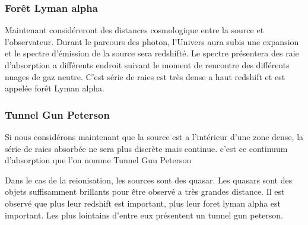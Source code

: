 \subsubsection{Forêt Lyman alpha}


Maintenant considéreront des distances cosmologique entre la source et l'observateur.
Durant le parcours des photon, l'Univers aura subis une expansion et le spectre d'émission de la source sera redshifté.
Le spectre présentera des raie d’absorption a différents endroit suivant le moment de rencontre des différents nuages de gaz neutre.
C'est série de raies est très dense a haut redshift et est appelée forêt Lyman alpha.

\subsubsection{Tunnel Gun Peterson}

Si nous considérons maintenant que la source est a l’intérieur d'une zone dense, la série de raies absorbée ne sera plus discrète mais continue.
c'est ce continuum d’absorption que l'on nomme Tunnel Gun Peterson \cite{1965ApJ...141.1295S}


Dans le cas de la reionisation, les sources sont des quasar.
Les quasars sont des objets suffisamment brillants pour être observé a très grandes distance.
Il est observé que plus leur redshift est important, plus leur foret lyman alpha est important.
Les plus lointains d'entre eux présentent  un tunnel gun peterson.


